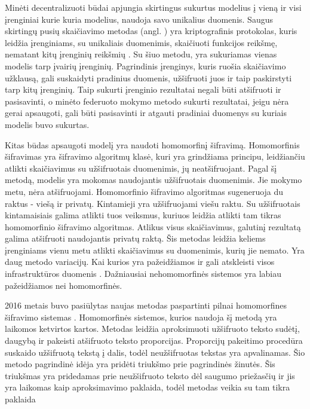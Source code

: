 \documentclass{VUMIFInfBakalaurinis}
\begin{document}
\par Minėti decentralizuoti būdai apjungia skirtingus sukurtus modelius į vieną ir visi įrenginiai kurie kuria modelius, naudoja savo unikalius duomenis. Saugus skirtingų pusių skaičiavimo metodas (angl. ) yra kriptografinis protokolas, kuris leidžia įrenginiams, su unikaliais duomenimis, skaičiuoti funkcijos reikšmę, nematant kitų įrenginių reikšmių \cite{6}. Su šiuo metodu, yra sukuriamas vienas modelis tarp įvairių įrenginių. Pagrindinis įrenginys, kuris ruošia skaičiavimo užklausą, gali suskaidyti pradinius duomenis, užšifruoti juos ir taip paskirstyti tarp kitų įrenginių. Taip sukurti įrenginio rezultatai negali būti atšifruoti ir pasisavinti, o minėto federuoto mokymo metodo sukurti rezultatai, jeigu nėra gerai apsaugoti, gali būti pasisavinti ir atgauti pradiniai duomenys su kuriais modelis buvo sukurtas.
\par  Kitas būdas apsaugoti modelį yra naudoti homomorfinį šifravimą. Homomorfinis šifravimas yra šifravimo algoritmų klasė, kuri yra grindžiama principu, leidžiančiu atlikti skaičiavimus su užšifruotais duomenimis, jų neatšifruojant. Pagal šį metodą, modelis yra mokomas naudojantis užšifruotais duomenimis. Jie mokymo metu, nėra atšifruojami. Homomorfinio šifravimo algoritmas sugeneruoja du raktus - viešą ir privatų. Kintamieji yra užšifruojami viešu raktu. Su užšifruotais kintamaisiais galima atlikti tuos veiksmus, kuriuos leidžia atlikti tam tikras homomorfinio šifravimo algoritmas. Atlikus visus skaičiavimus, galutinį rezultatą galima atšifruoti naudojantis privatų raktą. Šis metodas leidžia keliems įrenginiams vienu metu atlikti skaičiavimus su duomenimis, kurių jie nemato. Yra daug metodo variacijų. Kai kurios yra pažeidžiamos ir gali atskleisti visos infrastruktūros duomenis \cite{7}. Dažniausiai nehomomorfinės sistemos yra labiau pažeidžiamos nei homomorfinės.
\par 2016 metais buvo pasiūlytas naujas metodas paspartinti pilnai homomorfines šifravimo sistemas \cite{8}. Homomorfinės sistemos, kurios naudoja šį metodą yra laikomos ketvirtos kartos. Metodas leidžia aproksimuoti užšifruoto teksto sudėtį, daugybą ir pakeisti atšifruoto teksto proporcijas. 
Proporcijų pakeitimo procedūra suskaido užšifruotą tekstą į dalis, todėl neužšifruotas tekstas yra apvalinamas. Šio metodo pagrindinė idėja yra pridėti triukšmo prie pagrindinės žinutės. Šis triukšmas yra pridedamas prie neužšifruoto teksto dėl saugumo priežasčių ir jis yra laikomas kaip aproksimavimo paklaida, todėl metodas veikia su tam tikra paklaida
\end{document}

